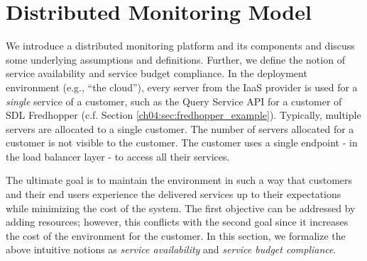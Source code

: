 
\section{Distributed Monitoring Model}
\label{ch04:sec:modelling}

We introduce a distributed monitoring platform and its components and
discuss some underlying assumptions and definitions.
Further, we define the notion of service availability and service budget compliance.
In the deployment environment (e.g., ``the cloud''), every  server from the IaaS provider is  used for a \emph{single} service of a customer, such as
the Query Service API for a customer of SDL Fredhopper (c.f. Section \ref{ch04:sec:fredhopper_example}).
Typically, multiple servers are allocated to a single customer.
The number of servers allocated for a customer is not visible to the customer.
The customer uses a single endpoint - in the load balancer layer - to access all their services.

The ultimate goal is to maintain the environment in such a way that customers and their end users experience the delivered services up to their expectations while minimizing the cost of the system.
The first objective can be addressed by adding resources; however, this conflicts with the second goal since it increases the cost of the environment for the customer.
In this section, we formalize the above intuitive notions as \emph{service availability} and \emph{service budget compliance}.

